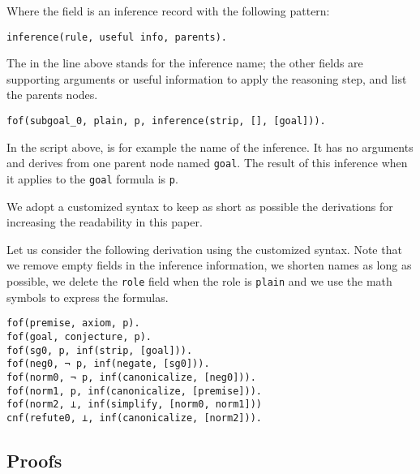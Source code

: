 \documentclass[../main.tex]{subfiles}
\begin{document}
Where the  field is an inference record with the following
pattern:

\begin{verbatim}
inference(rule, useful info, parents).
\end{verbatim}

The  in the line above stands for the inference name;
the other fields are supporting arguments or useful information to
apply the reasoning step, and list the parents nodes.

\begin{myexample}

\begin{verbatim}
fof(subgoal_0, plain, p, inference(strip, [], [goal])).
\end{verbatim}

In the script above, \strip is for example the name of the inference.
It has no arguments and derives from one parent node named  \verb!goal!. The
result of this inference when it applies to the \verb!goal! formula is
\verb!p!.

\end{myexample}

We adopt a customized \TSTP syntax to keep as short as possible the \Metis derivations for increasing the readability in this paper.

\begin{myexamplenum}
\label{fig:metis-example-tree}

Let us consider the following \TSTP derivation using
the customized \TSTP syntax. Note that we remove
empty fields in the inference information, we shorten names as long as possible, we delete the \verb!role! field when the role is
\verb!plain! and we use the math symbols to express the formulas.

\begin{verbatim}
fof(premise, axiom, p).
fof(goal, conjecture, p).
fof(sg0, p, inf(strip, [goal])).
fof(neg0, ¬ p, inf(negate, [sg0])).
fof(norm0, ¬ p, inf(canonicalize, [neg0])).
fof(norm1, p, inf(canonicalize, [premise])).
fof(norm2, ⊥, inf(simplify, [norm0, norm1]))
cnf(refute0, ⊥, inf(canonicalize, [norm2])).
\end{verbatim}

\end{myexamplenum}


\subsection{Proofs}
\label{ssec:metis-proofs}
\end{document}
